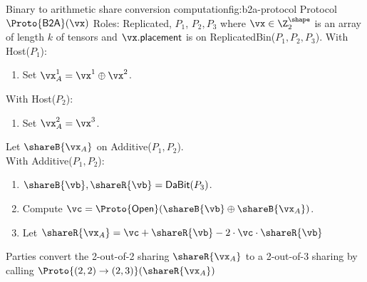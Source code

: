 \begin{Boxfig}{Binary to arithmetic share conversion computation}{fig:b2a-protocol}
  {Protocol $\Proto{\mathsf{B2A}}(\vx)$}
  Roles: Replicated, $P_1$, $P_2, P_3$ where $\vx \in \Z_{2}^\shape$ is an array of length $k$
  of tensors and
  $\vx.\mathsf{placement}$ is on ReplicatedBin($P_1, P_2, P_3$). \newline
  With Host($P_1$):
  \begin{enumerate}
  \item Set $\vx_A^1 = \vx^1 \oplus \vx^2$.
  \end{enumerate}
  With Host($P_2$):
  \begin{enumerate}
      \item Set $\vx_A^2 = \vx^3$.
  \end{enumerate}
  Let $\shareB{\vx_A}$ on Additive($P_1, P_2$). \\
  With Additive($P_1, P_2$):
  \begin{enumerate}
      \item $\shareB{\vb}, \shareR{\vb} = \textsf{DaBit}(P_3)$.
      \item Compute $\vc = \Proto{\mathsf{Open}}( \shareB{\vb} \oplus \shareB{\vx_A})$.
      \item Let $\shareR{\vx_A} = \vc + \shareR{\vb} - 2 \cdot \vc \cdot \shareR{\vb}$
  \end{enumerate}
  Parties convert the 2-out-of-2 sharing $\shareR{\vx_A}$ to a 2-out-of-3 sharing by calling
  $\Proto{ (2,2)\rightarrow (2,3)}(\shareR{\vx_A})$

\end{Boxfig}

